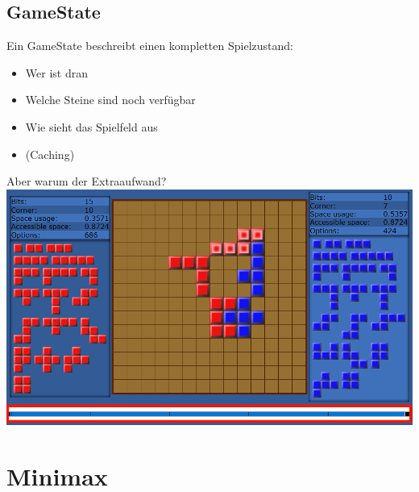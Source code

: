 \documentclass[12pt]{beamer}
\begin{document}
\subsection{GameState}
\begin{frame}
	Ein GameState beschreibt einen kompletten Spielzustand:
	\begin{itemize}
		\item Wer ist dran
		\item Welche Steine sind noch verfügbar
		\item Wie sieht das Spielfeld aus
		\item (Caching)
	\end{itemize}
\end{frame}
\begin{frame}
	Aber warum der Extraaufwand?\\ \vspace*{5pt}
	\includegraphics[width=\linewidth]{media/gamestate1.png}
\end{frame}

\section{Minimax}
\end{document}
